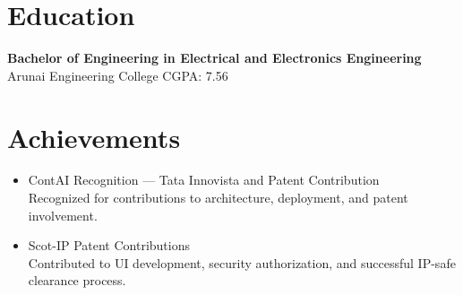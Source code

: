 \documentclass[letterpaper,10pt]{article}
\begin{document}
\section*{Education}

\textbf{Bachelor of Engineering in Electrical and Electronics Engineering} \\
Arunai Engineering College \hfill CGPA: 7.56

\section*{Achievements}

\begin{itemize}
    \item ContAI Recognition — Tata Innovista and Patent Contribution \\
    Recognized for contributions to architecture, deployment, and patent involvement.

    \item Scot-IP Patent Contributions \\
    Contributed to UI development, security authorization, and successful IP-safe clearance process.
\end{itemize}
\end{document}
